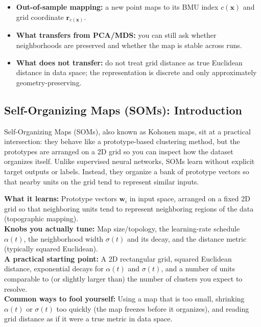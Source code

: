 \begin{tcolorbox}[summarybox, title={How to read a SOM map as a feature representation}]
\begin{itemize}
    \item \textbf{Out-of-sample mapping:} a new point maps to its BMU index \(c(\mathbf{x})\) and grid coordinate \(\mathbf{r}_{c(\mathbf{x})}\).
    \item \textbf{What transfers from PCA/MDS:} you can still ask whether neighborhoods are preserved and whether the map is stable across runs.
    \item \textbf{What does not transfer:} do not treat grid distance as true Euclidean distance in data space; the representation is discrete and only approximately geometry-preserving.
\end{itemize}
\end{tcolorbox}

\subsection{Self-Organizing Maps (SOMs): Introduction}
\label{sec:som_self_organizing_maps_soms_introduction}

Self-Organizing Maps (SOMs), also known as Kohonen maps, sit at a practical intersection: they behave like a prototype-based clustering method, but the prototypes are arranged on a 2D grid so you can inspect how the dataset organizes itself. Unlike supervised neural networks, SOMs learn without explicit target outputs or labels. Instead, they organize a bank of prototype vectors so that nearby units on the grid tend to represent similar inputs.

\begin{tcolorbox}[summarybox, title={SOM at a glance}]
\textbf{What it learns:} Prototype vectors \(\mathbf{w}_i\) in input space, arranged on a fixed 2D grid so that neighboring units tend to represent neighboring regions of the data (topographic mapping).\\
\textbf{Knobs you actually tune:} Map size/topology, the learning-rate schedule \(\alpha(t)\), the neighborhood width \(\sigma(t)\) and its decay, and the distance metric (typically squared Euclidean).\\
\textbf{A practical starting point:} A 2D rectangular grid, squared Euclidean distance, exponential decays for \(\alpha(t)\) and \(\sigma(t)\), and a number of units comparable to (or slightly larger than) the number of clusters you expect to resolve.\\
\textbf{Common ways to fool yourself:} Using a map that is too small, shrinking \(\alpha(t)\) or \(\sigma(t)\) too quickly (the map freezes before it organizes), and reading grid distance as if it were a true metric in data space.
\end{tcolorbox}

